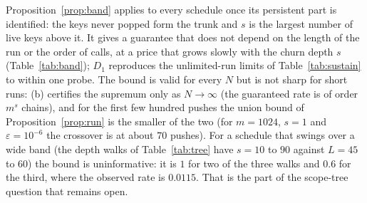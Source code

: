 \documentclass[11pt,a4paper]{article}
\theoremstyle{definition}
\theoremstyle{remark}
\begin{document}
Proposition~\ref{prop:band} applies to every schedule once its persistent part is identified: the keys never popped form the trunk and $s$ is the largest number of live keys above it. It gives a guarantee that does not depend on the length of the run or the order of calls, at a price that grows slowly with the churn depth $s$ (Table~\ref{tab:band}); $D_1$ reproduces the unlimited-run limits of Table~\ref{tab:sustain} to within one probe. The bound is valid for every $N$ but is not sharp for short runs: (b) certifies the supremum only as $N\to\infty$ (the guaranteed rate is of order $m^s$ chains), and for the first few hundred pushes the union bound of Proposition~\ref{prop:run} is the smaller of the two (for $m=1024$, $s=1$ and $\varepsilon=10^{-6}$ the crossover is at about $70$ pushes). For a schedule that swings over a wide band (the depth walks of Table~\ref{tab:tree} have $s=10$ to $90$ against $L=45$ to $60$) the bound is uninformative: it is $1$ for two of the three walks and $0.6$ for the third, where the observed rate is $0.0115$. That is the part of the scope-tree question that remains open.

\begin{table}[t]
\centering\small
\caption{Smallest probe limit $L$ at load $3/4$ for which $D_s\le\varepsilon$ (Proposition~\ref{prop:band}): no schedule, however long, that keeps at most $s$ keys live above a persistent trunk is refused with probability above $\varepsilon$. The column $s=1$ is the unlimited-run limit of Table~\ref{tab:sustain}. Each entry is found by bisection and the five smaller values are checked; the entry is a valid limit, its minimality is empirical.}\label{tab:band}

\end{table}

\begin{table}[t]
\centering\small
\caption{How close the closed form is: $m=1024$, $n=768$, $L=80$; $V_s$ estimated from $6000$ simulated trunks (unrestricted linear probing), against the bound $D_s$ of Proposition~\ref{prop:band}(c).}\label{tab:bandmc}

\end{table}

\begin{table}[t]
\centering\small
\caption{Smallest probe limit $L$ at load $3/4$ such that one fresh push is refused with probability at most $\varepsilon$ (Theorem~\ref{thm:law}), and such that no fresh name is ever refused on the table, however many push/pop pairs are made (Proposition~\ref{prop:sustain}).}\label{tab:sustain}

\end{table}
\end{document}
